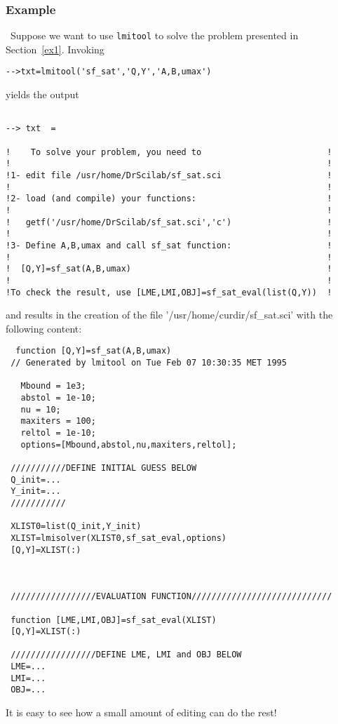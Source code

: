 \documentclass{article}
\begin{document}
\subsubsection{Example}\
Suppose we want to use {\tt lmitool} to solve the problem
presented in Section~\ref{ex1}. Invoking
\begin{verbatim}
-->txt=lmitool('sf_sat','Q,Y','A,B,umax')
\end{verbatim}
yields the output
\begin{verbatim}

--> txt  = 
 
!    To solve your problem, you need to                         !
!                                                               !
!1- edit file /usr/home/DrScilab/sf_sat.sci                     !
!                                                               !
!2- load (and compile) your functions:                          !
!                                                               !
!   getf('/usr/home/DrScilab/sf_sat.sci','c')                   !
!                                                               !
!3- Define A,B,umax and call sf_sat function:                   !
!                                                               !
!  [Q,Y]=sf_sat(A,B,umax)                                       !
!                                                               !
!To check the result, use [LME,LMI,OBJ]=sf_sat_eval(list(Q,Y))  !

\end{verbatim}
and results in the creation of the file '/usr/home/curdir/sf{\_}sat.sci'
with the following content:
\begin{verbatim}
  function [Q,Y]=sf_sat(A,B,umax)
 // Generated by lmitool on Tue Feb 07 10:30:35 MET 1995
   
   Mbound = 1e3;
   abstol = 1e-10;
   nu = 10;
   maxiters = 100;
   reltol = 1e-10;
   options=[Mbound,abstol,nu,maxiters,reltol];
    
 ///////////DEFINE INITIAL GUESS BELOW
 Q_init=...
 Y_init=...
 /////////// 
  
 XLIST0=list(Q_init,Y_init)
 XLIST=lmisolver(XLIST0,sf_sat_eval,options)
 [Q,Y]=XLIST(:)
  
  
  
 /////////////////EVALUATION FUNCTION////////////////////////////
  
 function [LME,LMI,OBJ]=sf_sat_eval(XLIST)
 [Q,Y]=XLIST(:)
  
 /////////////////DEFINE LME, LMI and OBJ BELOW
 LME=...
 LMI=...
 OBJ=...
\end{verbatim}
It is easy to see how a small amount of editing can 
do the rest!
\end{document}

